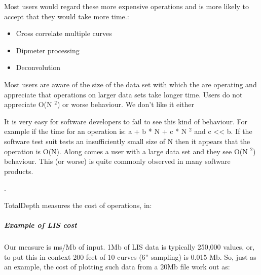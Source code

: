 \documentclass[letterpaper,10pt,english]{sphinxmanual}
\begin{document}
Most users would regard these more expensive operations and is more likely to accept that they would take more time.:
\begin{itemize}
\item {} 
Cross correlate multiple curves

\item {} 
Dipmeter processing

\item {} 
Deconvolution

\end{itemize}

Most users are aware of the size of the data set with which the are operating and appreciate that operations on larger data sets take longer time. Users do not appreciate O(N $^{\text{2}}$) or worse behaviour. We don’t like it either %
\begin{footnote}[1]\sphinxAtStartFootnote
It is very easy for software developers to fail to see this kind of behaviour. For example if the time for an operation is: a + b * N + c * N $^{\text{2}}$ and c \textless{}\textless{} b. If the software test suit tests an insufficiently small size of N then it appears that the operation is O(N). Along comes a user with a large data set and they see O(N $^{\text{2}}$) behaviour. This (or worse) is quite commonly observed in many software products.
%
\end{footnote}.

TotalDepth measures the cost of operations, in:

\begin{sphinxVerbatim}[commandchars=\\\{\}]
  
   
\end{sphinxVerbatim}


\subparagraph{Example of LIS cost}
\label{\detokenize{tech/performance:example-of-lis-cost}}
Our measure is ms/Mb of input. 1Mb of LIS data is typically 250,000 values, or, to put this in context 200 feet of 10 curves (6” sampling) is 0.015 Mb. So, just as an example, the cost of plotting such data from a 20Mb file  work out as:
\end{document}
